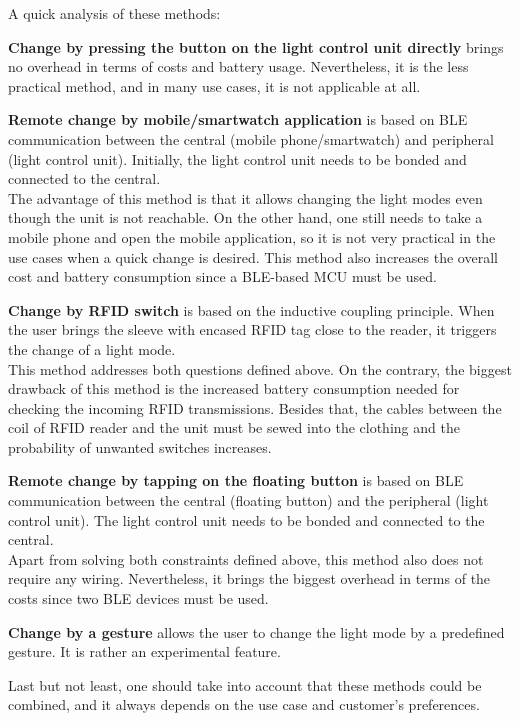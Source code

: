         
        A quick analysis of these methods:
        
        \textbf{Change by pressing the button on the light control unit directly} brings no overhead in terms of costs and battery usage. Nevertheless, it is the less practical method, and in many use cases, it is not applicable at all.
        
        \textbf{Remote change by mobile/smartwatch application} is based on BLE communication between the central (mobile phone/smartwatch) and peripheral (light control unit). Initially, the light control unit needs to be bonded and connected to the central.\\
        The advantage of this method is that it allows changing the light modes even though the unit is not reachable. On the other hand, one still needs to take a mobile phone and open the mobile application, so it is not very practical in the use cases when a quick change is desired. This method also increases the overall cost and battery consumption since a BLE-based MCU must be used.
        
        \textbf{Change by RFID switch} is based on the inductive coupling principle. When the user brings the sleeve with encased RFID tag close to the reader, it triggers the change of a light mode.\\
	    This method addresses both questions defined above. On the contrary, the biggest drawback of this method is the increased battery consumption needed for checking the incoming RFID transmissions. Besides that, the cables between the coil of RFID reader and the unit must be sewed into the clothing and the probability of unwanted switches increases.
        
        \textbf{Remote change by tapping on the floating button} is based on BLE communication between the central (floating button) and the peripheral (light control unit). The light control unit needs to be bonded and connected to the central.\\
        Apart from solving both constraints defined above, this method also does not require any wiring. Nevertheless, it brings the biggest overhead in terms of the costs since two BLE devices must be used.
        
        \textbf{Change by a gesture} allows the user to change the light mode by a predefined gesture. It is rather an experimental feature.
        
        
        Last but not least, one should take into account that these methods could be combined, and it always depends on the use case and customer's preferences.
        
